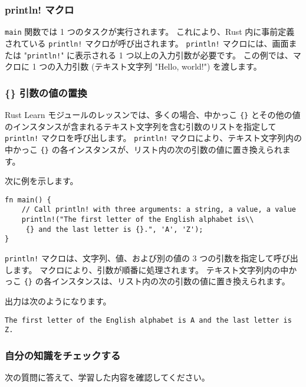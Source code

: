\subsubsection{println! マクロ}

\texttt{main} 関数では 1 つのタスクが実行されます。 これにより、Rust 内に事前定義されている \texttt{println!} マクロが呼び出されます。 \texttt{println!} マクロには、画面または "\texttt{println!}" に表示される 1 つ以上の入力引数が必要です。 この例では、マクロに 1 つの入力引数 (テキスト文字列 "Hello, world!") を渡します。

\subsubsection{\{\} 引数の値の置換}

Rust Learn モジュールのレッスンでは、多くの場合、中かっこ \texttt{\{\}} とその他の値のインスタンスが含まれるテキスト文字列を含む引数のリストを指定して \texttt{println!} マクロを呼び出します。 \texttt{println!} マクロにより、テキスト文字列内の中かっこ \texttt{\{\}} の各インスタンスが、リスト内の次の引数の値に置き換えられます。

次に例を示します。

\begin{lstlisting}[numbers=none]
fn main() {
    // Call println! with three arguments: a string, a value, a value
    println!("The first letter of the English alphabet is\\
     {} and the last letter is {}.", 'A', 'Z');
}
\end{lstlisting}

\texttt{println!} マクロは、文字列、値、および別の値の 3 つの引数を指定して呼び出します。 マクロにより、引数が順番に処理されます。 テキスト文字列内の中かっこ \texttt{\{\}} の各インスタンスは、リスト内の次の引数の値に置き換えられます。

出力は次のようになります。

\begin{lstlisting}[numbers=none]
The first letter of the English alphabet is A and the last letter is Z.
\end{lstlisting}

\subsubsection{自分の知識をチェックする}

次の質問に答えて、学習した内容を確認してください。


